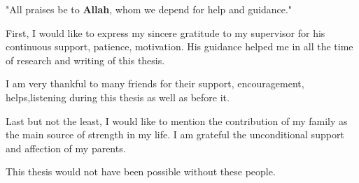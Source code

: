 \acknowledgement


"All praises be to \textbf{Allah}, whom we depend for help and guidance."

First, I would like to express my sincere gratitude to my supervisor for his continuous support, patience, motivation. His guidance helped me in all the time of research and writing of this thesis. 

I am very thankful to many friends for their support, encouragement, helps,listening during this thesis as well as before it.

Last but not the least, I would like to mention the contribution of my family as the main source of strength in my life. I am grateful the unconditional support and affection of my parents.

This thesis would not have been possible without these people.
